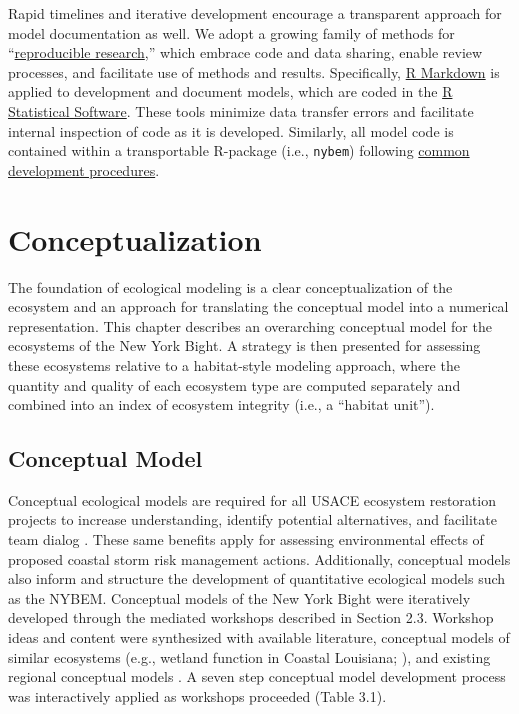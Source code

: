 \documentclass[
]{book}
\begin{document}
Rapid timelines and iterative development encourage a transparent approach for model documentation as well. We adopt a growing family of methods for ``\href{https://ropensci.github.io/reproducibility-guide/sections/introduction/}{reproducible research},'' which embrace code and data sharing, enable review processes, and facilitate use of methods and results. Specifically, \href{https://rmarkdown.rstudio.com/}{R Markdown} is applied to development and document models, which are coded in the \href{https://cran.r-project.org/}{R Statistical Software}. These tools minimize data transfer errors and facilitate internal inspection of code as it is developed. Similarly, all model code is contained within a transportable R-package (i.e., \texttt{nybem}) following \href{https://r-pkgs.org/}{common development procedures}.

\hypertarget{conceptualization}{%
\chapter{Conceptualization}\label{conceptualization}}

The foundation of ecological modeling is a clear conceptualization of the ecosystem and an approach for translating the conceptual model into a numerical representation. This chapter describes an overarching conceptual model for the ecosystems of the New York Bight. A strategy is then presented for assessing these ecosystems relative to a habitat-style modeling approach, where the quantity and quality of each ecosystem type are computed separately and combined into an index of ecosystem integrity (i.e., a ``habitat unit'').

\hypertarget{conceptual-model}{%
\section{Conceptual Model}\label{conceptual-model}}

Conceptual ecological models are required for all USACE ecosystem restoration projects to increase understanding, identify potential alternatives, and facilitate team dialog \citep{fischenich_application_2008, us_army_corps_of_engineers_assuring_2011}. These same benefits apply for assessing environmental effects of proposed coastal storm risk management actions. Additionally, conceptual models also inform and structure the development of quantitative ecological models \citep{grant_ecological_2008, swannack_ecological_2012} such as the NYBEM. Conceptual models of the New York Bight were iteratively developed through the mediated workshops described in Section 2.3. Workshop ideas and content were synthesized with available literature, conceptual models of similar ecosystems (e.g., wetland function in Coastal Louisiana; \citet{twilley_formulation_2004}), and existing regional conceptual models \citep[e.g.,][]{montagna_conceptual_2013}. A seven step conceptual model development process was interactively applied as workshops proceeded (Table 3.1).
\end{document}
